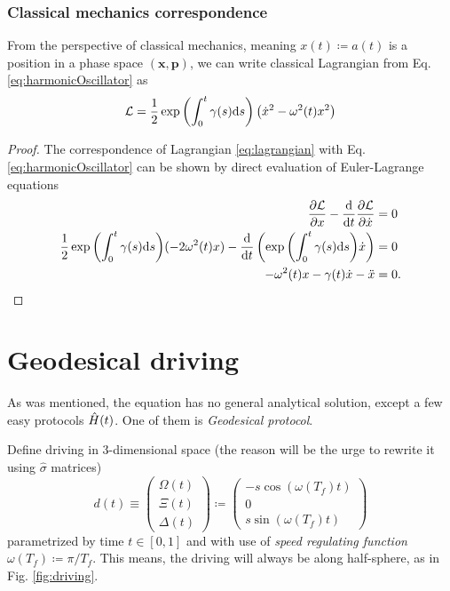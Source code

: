\subsubsection{Classical mechanics correspondence}
From the perspective of classical mechanics, meaning $x(t)\coloneqq a(t)$ is a position in a phase space $(\bm x,\bm p)$, we can write classical Lagrangian from Eq. \ref{eq:harmonicOscillator} as
\begin{equation}
    \mathcal L=\frac{1}{2}\exp{\left(\int_0^t\gamma(s)\ensuremath{\mathrm{d}}s\right)}\left(\dot x^2-\omega^2(t)x^2\right)
    \label{eq:lagrangian}
\end{equation}
\begin{proof}
    The correspondence of Lagrangian \ref{eq:lagrangian} with Eq. \ref{eq:harmonicOscillator} can be shown by direct evaluation of Euler-Lagrange equations
    \begin{equation}
        \begin{split}
            \frac{\partial \mathcal L}{\partial x}-\frac{\mathrm{d} }{\mathrm{d} t}\frac{\partial \mathcal L}{\partial \dot x}&=0\\
            \frac{1}{2}\exp{\left(\int_0^t\gamma(s)\ensuremath{\mathrm{d}}s\right)}(-2 \omega^2(t)x)-\frac{\mathrm{d} }{\mathrm{d} t}\left(\exp{\left(\int_0^t\gamma(s)\ensuremath{\mathrm{d}}s\right)}\dot x\right) &=0\\
            -\omega^2(t)x-\gamma(t)\dot x-\ddot x&=0.
        \end{split}
    \end{equation}
\end{proof}


\section{Geodesical driving}
As was mentioned, the \Schrodinger equation has no general analytical solution, except a few easy protocols $\hat{H}(t)$. One of them is \emph{Geodesical protocol}. 

Define driving in 3-dimensional space (the reason will be the urge to rewrite it using $\hat\sigma$ matrices)
\begin{equation}
    d(t)\equiv \begin{pmatrix}
        \Omega(t)\\
        \Xi(t)\\
        \Delta(t)
    \end{pmatrix}\coloneqq \begin{pmatrix}
        -s \cos(\omega(T_f)t)\\
        0\\
        s \sin(\omega(T_f)t)
    \end{pmatrix}
\end{equation}
parametrized by time $t\in[0,1]$ and with use of \emph{speed regulating function} $\omega(T_f)\coloneqq \pi/T_f$. This means, the driving will always be along half-sphere, as in Fig. \ref{fig:driving}.

